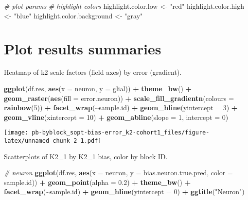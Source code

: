 \documentclass[
]{article}
\newenvironment{Shaded}{\begin{snugshade}}{\end{snugshade}}
\newcommand{\AttributeTok}[1]{\textcolor[rgb]{0.13,0.29,0.53}{#1}}
\newcommand{\CommentTok}[1]{\textcolor[rgb]{0.56,0.35,0.01}{\textit{#1}}}
\newcommand{\DecValTok}[1]{\textcolor[rgb]{0.00,0.00,0.81}{#1}}
\newcommand{\FloatTok}[1]{\textcolor[rgb]{0.00,0.00,0.81}{#1}}
\newcommand{\FunctionTok}[1]{\textcolor[rgb]{0.13,0.29,0.53}{\textbf{#1}}}
\newcommand{\NormalTok}[1]{#1}
\newcommand{\OtherTok}[1]{\textcolor[rgb]{0.56,0.35,0.01}{#1}}
\newcommand{\SpecialCharTok}[1]{\textcolor[rgb]{0.81,0.36,0.00}{\textbf{#1}}}
\newcommand{\StringTok}[1]{\textcolor[rgb]{0.31,0.60,0.02}{#1}}
\begin{document}
\begin{Shaded}
\begin{Highlighting}[]
\CommentTok{\# plot params}
\CommentTok{\# highlight colors}
\NormalTok{highlight.color.low }\OtherTok{\textless{}{-}} \StringTok{"red"}
\NormalTok{highlight.color.high }\OtherTok{\textless{}{-}} \StringTok{"blue"}
\NormalTok{highlight.color.background }\OtherTok{\textless{}{-}} \StringTok{"gray"}
\end{Highlighting}
\end{Shaded}

\hypertarget{plot-results-summaries}{%
\section{Plot results summaries}\label{plot-results-summaries}}

Heatmap of k2 scale factors (field axes) by error (gradient).

\begin{Shaded}
\begin{Highlighting}[]
\FunctionTok{ggplot}\NormalTok{(df.res, }\FunctionTok{aes}\NormalTok{(}\AttributeTok{x =}\NormalTok{ neuron, }\AttributeTok{y =}\NormalTok{ glial)) }\SpecialCharTok{+} \FunctionTok{theme\_bw}\NormalTok{() }\SpecialCharTok{+}
  \FunctionTok{geom\_raster}\NormalTok{(}\FunctionTok{aes}\NormalTok{(}\AttributeTok{fill =}\NormalTok{ error.neuron)) }\SpecialCharTok{+}
  \FunctionTok{scale\_fill\_gradientn}\NormalTok{(}\AttributeTok{colours =} \FunctionTok{rainbow}\NormalTok{(}\DecValTok{5}\NormalTok{)) }\SpecialCharTok{+} \FunctionTok{facet\_wrap}\NormalTok{(}\SpecialCharTok{\textasciitilde{}}\NormalTok{sample.id) }\SpecialCharTok{+}
  \FunctionTok{geom\_hline}\NormalTok{(}\AttributeTok{yintercept =} \DecValTok{3}\NormalTok{) }\SpecialCharTok{+} \FunctionTok{geom\_vline}\NormalTok{(}\AttributeTok{xintercept =} \DecValTok{10}\NormalTok{) }\SpecialCharTok{+}
  \FunctionTok{geom\_abline}\NormalTok{(}\AttributeTok{slope =} \DecValTok{1}\NormalTok{, }\AttributeTok{intercept =} \DecValTok{0}\NormalTok{)}
\end{Highlighting}
\end{Shaded}

\texttt{[image: pb-byblock\_sopt-bias-error\_k2-cohort1\_files/figure-latex/unnamed-chunk-2-1.pdf]}

Scatterplots of K2\_1 by K2\_1 bias, color by block ID.

\begin{Shaded}
\begin{Highlighting}[]
\CommentTok{\# neuron}
\FunctionTok{ggplot}\NormalTok{(df.res, }\FunctionTok{aes}\NormalTok{(}\AttributeTok{x =}\NormalTok{ neuron, }\AttributeTok{y =}\NormalTok{ bias.neuron.true.pred, }\AttributeTok{color =}\NormalTok{ sample.id)) }\SpecialCharTok{+} 
  \FunctionTok{geom\_point}\NormalTok{(}\AttributeTok{alpha =} \FloatTok{0.2}\NormalTok{) }\SpecialCharTok{+} \FunctionTok{theme\_bw}\NormalTok{() }\SpecialCharTok{+} \FunctionTok{facet\_wrap}\NormalTok{(}\SpecialCharTok{\textasciitilde{}}\NormalTok{sample.id) }\SpecialCharTok{+} \FunctionTok{geom\_hline}\NormalTok{(}\AttributeTok{yintercept =} \DecValTok{0}\NormalTok{) }\SpecialCharTok{+}
  \FunctionTok{ggtitle}\NormalTok{(}\StringTok{"Neuron"}\NormalTok{)}
\end{Highlighting}
\end{Shaded}
\end{document}
